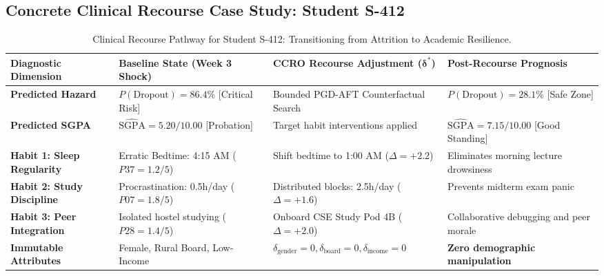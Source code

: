\documentclass[10pt,a4paper]{article}
\begin{document}
\newpage
\subsection{Concrete Clinical Recourse Case Study: Student S-412}
\begin{table}[h!]
\centering
\small
\renewcommand{\arraystretch}{1.25}
\begin{tabularx}{\textwidth}{lp{3.2cm}p{3.8cm}>{\raggedright\arraybackslash}X}
\toprule
\textbf{Diagnostic Dimension} & \textbf{Baseline State (Week 3 Shock)} & \textbf{CCRO Recourse Adjustment ($\boldsymbol{\delta}^*$)} & \textbf{Post-Recourse Prognosis} \\
\midrule
\rowcolor{RedLight} \textbf{Predicted Hazard} & \textbf{$P(\text{Dropout}) = 86.4\%$} [Critical Risk] & Bounded PGD-AFT Counterfactual Search & \textbf{$P(\text{Dropout}) = 28.1\%$} [Safe Zone] \\
\rowcolor{CanvasBG} \textbf{Predicted SGPA} & $\widehat{\text{SGPA}} = 5.20 / 10.00$ [Probation] & Target habit interventions applied & $\widehat{\text{SGPA}} = 7.15 / 10.00$ [Good Standing] \\
\midrule
\rowcolor{BlueLight} \textbf{Habit 1: Sleep Regularity} & Erratic Bedtime: 4:15 AM ($P37 = 1.2/5$) & Shift bedtime to 1:00 AM ($\Delta = +2.2$) & Eliminates morning lecture drowsiness \\
\rowcolor{BlueLight} \textbf{Habit 2: Study Discipline} & Procrastination: 0.5h/day ($P07 = 1.8/5$) & Distributed blocks: 2.5h/day ($\Delta = +1.6$) & Prevents midterm exam panic \\
\rowcolor{BlueLight} \textbf{Habit 3: Peer Integration} & Isolated hostel studying ($P28 = 1.4/5$) & Onboard CSE Study Pod 4B ($\Delta = +2.0$) & Collaborative debugging and peer morale \\
\midrule
\rowcolor{GoldBG} \textbf{Immutable Attributes} & Female, Rural Board, Low-Income & $\delta_{\text{gender}} = 0, \delta_{\text{board}} = 0, \delta_{\text{income}} = 0$ & \textbf{Zero demographic manipulation} \\
\bottomrule
\end{tabularx}
\caption{Clinical Recourse Pathway for Student S-412: Transitioning from Attrition to Academic Resilience.}
\end{table}

\end{document}

